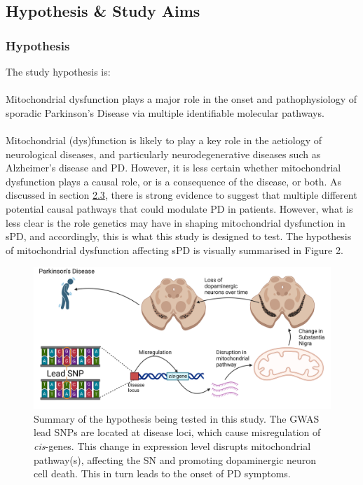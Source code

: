 \documentclass{article}
\begin{document}
\subsection{Hypothesis \& Study Aims}
\subsubsection{Hypothesis}
\label{subsubsec:hypothesis}
The study hypothesis is:
\\
\\
Mitochondrial dysfunction plays a major role in the onset and pathophysiology of sporadic Parkinson’s Disease via multiple identifiable molecular pathways.
\\
\\Mitochondrial (dys)function is likely to play a key role in the aetiology of neurological diseases\cite{Bartman2024MitochondrialDiseases}, and particularly neurodegenerative diseases such as Alzheimer's disease and PD\cite{MonzioCompagnoni2020TheDisease}. However, it is less certain whether mitochondrial dysfunction plays a causal role, or is a consequence of the disease, or both. As discussed in section \hyperref[subsubsec:mitochondria]{2.3}, there is strong evidence to suggest that multiple different potential causal pathways that could modulate PD in patients. However, what is less clear is the role genetics may have in shaping mitochondrial dysfunction in sPD, and accordingly, this is what this study is designed to test. The hypothesis of mitochondrial dysfunction affecting sPD is visually summarised in Figure 2.
\begin{figure}[h]
    \centering
    \includegraphics[width=1\linewidth]{Thesis/thesis images/Visualhypothesis.png}
    \caption{Summary of the hypothesis being tested in this study. The GWAS lead SNPs are located at disease loci, which cause misregulation of \textit{cis}-genes. This change in expression level disrupts mitochondrial pathway(s), affecting the SN and promoting dopaminergic neuron cell death. This in turn leads to the onset of PD symptoms.}
    \label{fig:enter-label}
\end{figure}
\end{document}
